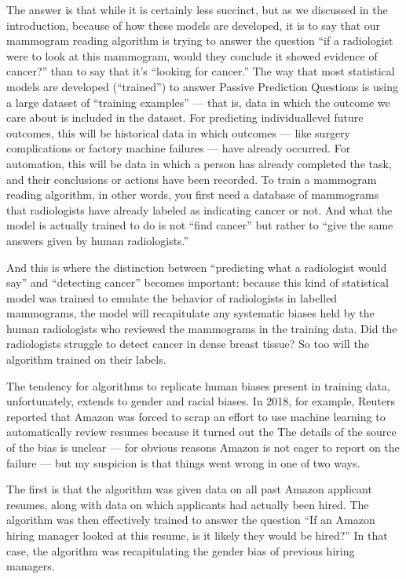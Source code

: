 \documentclass[letterpaper,10pt,english]{jupyterBook}
\begin{document}
\sphinxAtStartPar
The answer is that while it is certainly less succinct, but as we discussed in the introduction, because of how these models are developed, it is  to say that our mammogram reading algorithm is trying to answer the question “if a radiologist were to look at this mammogram, would they conclude it showed evidence of cancer?” than to say that it’s “looking for cancer.” The way that most statistical models are developed (“trained”) to answer Passive Prediction Questions is using a large dataset of “training examples” — that is, data in which the outcome we care about is included in the dataset. For predicting individual\sphinxhyphen{}level future outcomes, this will be historical data in which outcomes — like surgery complications or factory machine failures — have already occurred. For automation, this will be data in which a person has already completed the task, and their conclusions or actions have been recorded. To train a mammogram reading algorithm, in other words, you first need a database of mammograms that radiologists have already labeled as indicating cancer or not. And what the model is actually trained to do is not “find cancer” but rather to “give the same answers given by human radiologists.”

\sphinxAtStartPar
And this is where the distinction between “predicting what a radiologist would say” and “detecting cancer” becomes important: because this kind of statistical model was trained to emulate the behavior of radiologists in labelled mammograms, the model will recapitulate any systematic biases held by the human radiologists who reviewed the mammograms in the training data. Did the radiologists struggle to detect cancer in dense breast tissue? So too will the algorithm trained on their labels.

\sphinxAtStartPar
The tendency for algorithms to replicate human biases present in training data, unfortunately, extends to gender and racial biases. In 2018, for example, Reuters reported that Amazon was forced to scrap an effort to use machine learning to automatically review resumes because it turned out the  The  details of the source of the bias is unclear — for obvious reasons Amazon is not eager to report on the failure — but my suspicion is that things went wrong in one of two ways.

\sphinxAtStartPar
The first is that the algorithm was given data on all past Amazon applicant resumes, along with data on which applicants had actually been hired. The algorithm was then effectively trained to answer the question “If an Amazon hiring manager looked at this resume, is it likely they would be hired?” In that case, the algorithm was recapitulating the gender bias of previous hiring managers.
\end{document}

